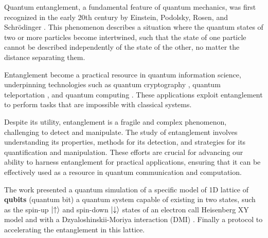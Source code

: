 Quantum entanglement, a fundamental feature of quantum mechanics, 
was first recognized in the early 20th century by Einstein, 
Podolsky, Rosen, and Schrödinger \cite{horodecki_quantum_2009}. This phenomenon describes 
a situation where the quantum states of two or more particles 
become intertwined, such that the state of one particle cannot 
be described independently of the state of the other, 
no matter the distance separating them. 



Entanglement become a practical resource 
in quantum information science, 
underpinning technologies such as quantum cryptography \cite{pirandola_advances_2020}, 
quantum teleportation \cite{bennett_teleporting_1993}, and quantum computing \cite{whitfield_quantum_2022}. 
These applications exploit entanglement 
to perform tasks that are impossible 
with classical systems.

Despite its utility, entanglement is a fragile and complex phenomenon, 
challenging to detect and manipulate. 
The study of entanglement involves understanding 
its properties, methods for its detection, and 
strategies for its quantification and manipulation. 
These efforts are crucial for advancing our ability 
to harness entanglement for practical applications, 
ensuring that it can be effectively used as a resource
in quantum communication and computation.



The work presented a quantum simulation of a specific
model of 1D lattice of \textbf{qubits} (quantum bit) a quantum system 
capable of existing in two states, such as 
the spin-up \(\ket{\uparrow}\) and spin-down 
\(\ket{\downarrow}\) states of an electron call Heisenberg XY model \cite{van_der_sijs_heisenberg_1993}
and with a Dzyaloshinskii-Moriya interaction (DMI) \cite{moriya_anisotropic_1960,dzyaloshinsky_thermodynamic_1958}. Finally 
a protocol to accelerating the entanglement in this lattice. 



